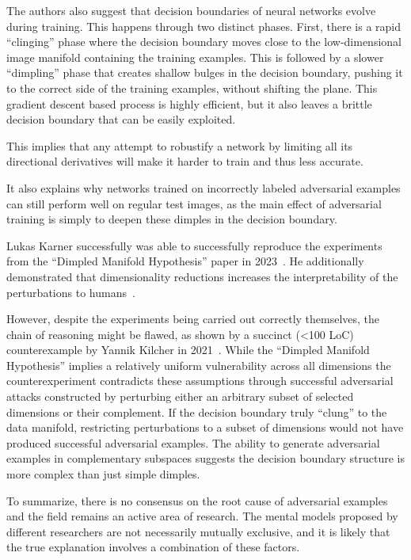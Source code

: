 \documentclass[a4paper, oneside]{discothesis}
\begin{document}
The authors also suggest that decision boundaries of neural networks evolve during training. This happens through two distinct phases. First, there is a rapid ``clinging'' phase where the decision boundary moves close to the low-dimensional image manifold containing the training examples. This is followed by a slower ``dimpling'' phase that creates shallow bulges in the decision boundary, pushing it to the correct side of the training examples, without shifting the plane. This gradient descent based process is highly efficient, but it also leaves a brittle decision boundary that can be easily exploited.

This implies that any attempt to robustify a network by limiting all its directional derivatives will make it harder to train and thus less accurate.

It also explains why networks trained on incorrectly labeled adversarial examples can still perform well on regular test images, as the main effect of adversarial training is simply to deepen these dimples in the decision boundary.

Lukas Karner successfully was able to successfully reproduce the experiments from the ``Dimpled Manifold Hypothesis'' paper in 2023~\cite{karner2023dimpled}. He additionally demonstrated that dimensionality reductions increases the interpretability of the perturbations to humans~\cite{karner2023dimpled}.

However, despite the experiments being carried out correctly themselves, the chain of reasoning might be flawed, as shown by a succinct (<100 LoC) counterexample by Yannik Kilcher in 2021~\cite{kilcher2021dimpledcode, kilcher2021dimpled}. While the ``Dimpled Manifold Hypothesis'' implies a relatively uniform vulnerability across all dimensions the counterexperiment contradicts these assumptions through successful adversarial attacks constructed by perturbing either an arbitrary subset of selected dimensions or their complement. If the decision boundary truly ``clung'' to the data manifold, restricting perturbations to a subset of dimensions would not have produced successful adversarial examples. The ability to generate adversarial examples in complementary subspaces suggests the decision boundary structure is more complex than just simple dimples.

To summarize, there is no consensus on the root cause of adversarial examples and the field remains an active area of research. The mental models proposed by different researchers are not necessarily mutually exclusive, and it is likely that the true explanation involves a combination of these factors.
\end{document}
